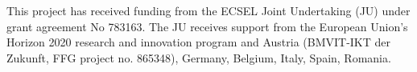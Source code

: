 This project has received funding from the ECSEL Joint Undertaking (JU) under grant agreement No 783163. The JU receives support from the European Union's Horizon 2020 research and innovation program and Austria (BMVIT-IKT der Zukunft, FFG project no. 865348), Germany, Belgium, Italy, Spain, Romania.
